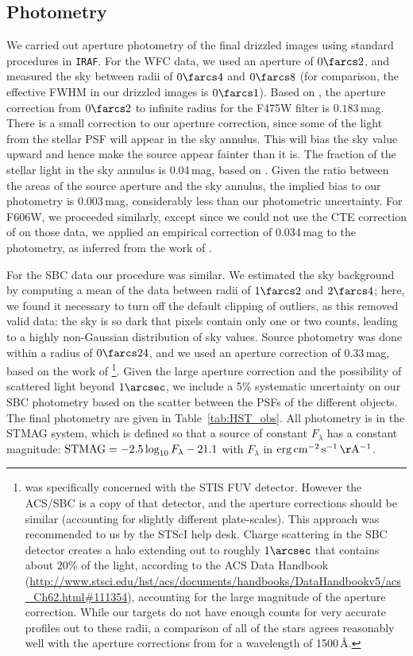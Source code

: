 \documentclass[iop]{emulateapj}
\begin{document}
\subsection{Photometry}
We carried out aperture photometry of the final drizzled images using
standard procedures in \texttt{IRAF}.  For the WFC data, we used an
aperture of $0\farcs2$, and measured the sky between radii of
$0\farcs4$ and $0\farcs8$ (for comparison, the effective FWHM in our
drizzled images is $0\farcs1$).  Based on \citet{sjb+05}, the aperture
correction from $0\farcs2$ to infinite radius for the
F475W filter is $0.183$\,mag.  There is a small correction to our
aperture correction, since some of the light from the stellar PSF will
appear in the sky annulus.  This will bias the sky value upward and
hence make the source appear fainter than it is.  The fraction of the
stellar light in the sky annulus is 0.04\,mag, based on
\citet{sjb+05}.  Given the ratio between the areas of the source
aperture and the sky annulus, the implied bias to our photometry is
0.003\,mag, considerably less than our photometric uncertainty.  For
F606W, we proceeded similarly, except since we could not use the CTE
correction of \citet{ab10} on those data, we applied an empirical
correction of 0.034\,mag to the photometry, as inferred from the work
of \citet{clkp+09}.

For the SBC data our procedure was similar.  We estimated the sky
background by computing a mean of the data between radii of $1\farcs2$
and $2\farcs4$; here, we found it necessary to turn off the default
clipping of outliers, as this removed valid data: the sky is so dark
that pixels contain only one or two counts, leading to a highly
non-Gaussian distribution of sky values.  Source photometry was done
within a radius of $0\farcs24$, and we used an aperture correction of
$0.33$\,mag, based on the work of
\citet{pbmd03}\footnote{\citet{pbmd03} was specifically concerned with
 the STIS FUV detector.  However the ACS/SBC is a copy of that
 detector, and the aperture corrections should be similar (accounting
 for slightly different plate-scales).  This approach was recommended
 to us by the STScI help desk.  Charge scattering in the SBC detector
 creates a halo extending out to roughly $1\arcsec$ that contains
 about 20\% of the light, according to the ACS Data Handbook
 (\url{http://www.stsci.edu/hst/acs/documents/handbooks/DataHandbookv5/acs\_Ch62.html\#111354}),
 accounting for the large magnitude of the aperture correction.
 While our targets do not have enough counts for very accurate
 profiles out to these radii, a comparison of all of the stars agrees
 reasonably well with the aperture corrections from \citet{pbmd03}
 for a wavelength of 1500\,\AA.}.  Given the large aperture correction
and the possibility of scattered light beyond $1\arcsec$, we include a
5\% systematic uncertainty on our SBC photometry based on the scatter
between the PSFs of the different objects.  The final photometry are given in
Table~\ref{tab:HST_obs}.  All photometry is in the STMAG system, which
is defined so that a source of constant $F_{\lambda}$ has a constant
magnitude: ${\rm STMAG}=-2.5\log_{10} F_{\lambda}-21.1$ with
$F_{\lambda}$ in ${\rm erg\,cm^{-2}\,s^{-1}\,\AA^{-1}}$.
\end{document}
